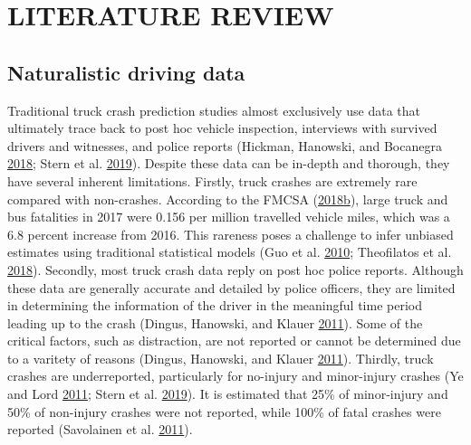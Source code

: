 \documentclass[12pt]{book}
\numberwithin{equation}{chapter}
\begin{document}
\hypertarget{literature-review}{%
\chapter{LITERATURE REVIEW}\label{literature-review}}

\hypertarget{naturalistic-driving-data}{%
\section{Naturalistic driving data}\label{naturalistic-driving-data}}

Traditional truck crash prediction studies almost exclusively use data that ultimately trace back to post hoc vehicle inspection, interviews with survived drivers and witnesses, and police reports (Hickman, Hanowski, and Bocanegra \protect\hyperlink{ref-hickman2018synthetic}{2018}; Stern et al. \protect\hyperlink{ref-stern2019data}{2019}). Despite these data can be in-depth and thorough, they have several inherent limitations. Firstly, truck crashes are extremely rare compared with non-crashes. According to the FMCSA (\protect\hyperlink{ref-fmcsareport2017}{2018}\protect\hyperlink{ref-fmcsareport2017}{b}), large truck and bus fatalities in 2017 were 0.156 per million travelled vehicle miles, which was a 6.8 percent increase from 2016. This rareness poses a challenge to infer unbiased estimates using traditional statistical models (Guo et al. \protect\hyperlink{ref-guo2010near}{2010}; Theofilatos et al. \protect\hyperlink{ref-theofilatos2018impact}{2018}). Secondly, most truck crash data reply on post hoc police reports. Although these data are generally accurate and detailed by police officers, they are limited in determining the information of the driver in the meaningful time period leading up to the crash (Dingus, Hanowski, and Klauer \protect\hyperlink{ref-dingus2011estimating}{2011}). Some of the critical factors, such as distraction, are not reported or cannot be determined due to a varitety of reasons (Dingus, Hanowski, and Klauer \protect\hyperlink{ref-dingus2011estimating}{2011}). Thirdly, truck crashes are underreported, particularly for no-injury and minor-injury crashes (Ye and Lord \protect\hyperlink{ref-ye2011investigation}{2011}; Stern et al. \protect\hyperlink{ref-stern2019data}{2019}). It is estimated that 25\% of minor-injury and 50\% of non-injury crashes were not reported, while 100\% of fatal crashes were reported (Savolainen et al. \protect\hyperlink{ref-savolainen2011statistical}{2011}).
\end{document}
